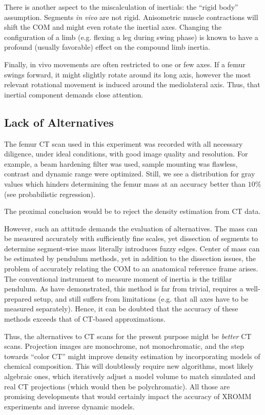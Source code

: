 There is another aspect to the miscalculation of inertials: the ``rigid body'' assumption.
Segments \emph{in vivo} are not rigid.
Anisometric muscle contractions will shift the COM and might even rotate the inertial axes.
Changing the configuration of a limb (e.g. flexing a leg during swing phase) is known to have a profound (usually favorable) effect on the compound limb inertia.

Finally, in vivo movements are often restricted to one or few axes.
If a femur swings forward, it might slightly rotate around its long axis, however the most relevant rotational movement is induced around the mediolateral axis.
Thus, that inertial component demands close attention.


\subsection{Lack of Alternatives}
\label{sec:orgcbe870c}
The femur CT scan used in this experiment was recorded with all necessary diligence, under ideal conditions, with good image quality and resolution.
For example, a beam hardening filter was used, sample mounting was flawless, contrast and dynamic range were optimized.
Still, we see a distribution for gray values which hinders determining the femur mass at an accuracy better than \(10\%\) (see probabilistic regression).

The proximal conclusion would be to reject the density estimation from CT data.


However, such an attitude demands the evaluation of alternatives.
The mass can be measured accurately with sufficiently fine scales, yet dissection of segments to determine segment-wise mass literally introduces fuzzy edges.
Center of mass can be estimated by pendulum methods, yet in addition to the dissection issues, the problem of accurately relating the COM to an anatomical reference frame arises.
The conventional instrument to measure moment of inertia is the trifilar pendulum.
As \citet{Durston2022} have demonstrated, this method is far from trivial, requires a well-prepared setup, and still suffers from limitations (e.g. that all axes have to be measured separately).
Hence, it can be doubted that the accuracy of these methods exceeds that of CT-based approximations.

Thus, the alternatives to CT scans for the present purpose might be \emph{better} CT scans.
Projection images are monochrome, not monochromatic, and the step towards ``color CT'' might improve density estimation by incorporating models of chemical composition.
This will doubtlessly require new algorithms, most likely algebraic ones, which iteratively adjust a model volume to match simulated and real CT projections (which would then be polychromatic).
All those are promising developments that would certainly impact the accuracy of XROMM experiments and inverse dynamic models.


